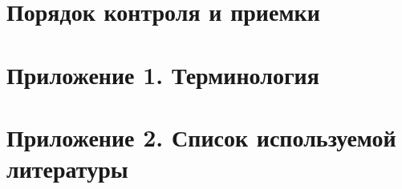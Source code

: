 \documentclass[
encoding=utf8
]{twoeskd}
\begin{document}
\newpage
\section{Порядок контроля и приемки}


\newpage
\section{Приложение 1. Терминология}


\newpage
\section{Приложение 2. Список используемой литературы}



\newpage
\eskdListOfChanges

\end{document}
